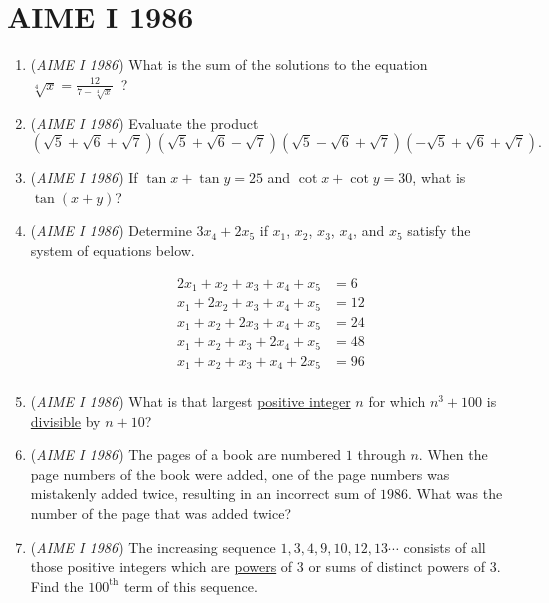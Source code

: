 \section{AIME I 1986}
        \begin{enumerate}
        	\item (\textit{AIME I 1986}) What is the sum of the solutions to the equation $\sqrt[4]{x} = \frac{12}{7 - \sqrt[4]{x}}$ ?


 

	\item (\textit{AIME I 1986}) Evaluate the product 
 \[\left(\sqrt{5}+\sqrt{6}+\sqrt{7}\right)\left(\sqrt{5}+\sqrt{6}-\sqrt{7}\right)\left(\sqrt{5}-\sqrt{6}+\sqrt{7}\right)\left(-\sqrt{5}+\sqrt{6}+\sqrt{7}\right).\]


	\item (\textit{AIME I 1986}) If $\tan x+\tan y=25$ and $\cot x + \cot y=30$, what is $\tan(x+y)$?


 

	\item (\textit{AIME I 1986}) Determine $3x_4+2x_5$ if $x_1$, $x_2$, $x_3$, $x_4$, and $x_5$ satisfy the system of equations below.

 \begin{align*} 2x_1+x_2+x_3+x_4+x_5&=6 \\ x_1+2x_2+x_3+x_4+x_5&=12 \\ x_1+x_2+2x_3+x_4+x_5&=24 \\ x_1+x_2+x_3+2x_4+x_5&=48 \\ x_1+x_2+x_3+x_4+2x_5&=96 \\ \end{align*}



	\item (\textit{AIME I 1986}) What is that largest \href{https://artofproblemsolving.com/wiki/index.php?title=Positive\_integer}{positive integer} $n$ for which $n^3+100$ is \href{https://artofproblemsolving.com/wiki/index.php?title=Divisible}{divisible} by $n+10$?


 

	\item (\textit{AIME I 1986}) The pages of a book are numbered $1$ through $n$. When the page numbers of the book were added, one of the page numbers was mistakenly added twice, resulting in an incorrect sum of $1986$. What was the number of the page that was added twice?


 

	\item (\textit{AIME I 1986}) The increasing sequence $1,3,4,9,10,12,13\cdots$ consists of all those positive integers which are \href{https://artofproblemsolving.com/wiki/index.php?title=Powers&action=edit&redlink=1}{powers} of 3 or sums of distinct powers of 3. Find the $100^{\mbox{th}}$ term of this sequence.



\end{enumerate}
